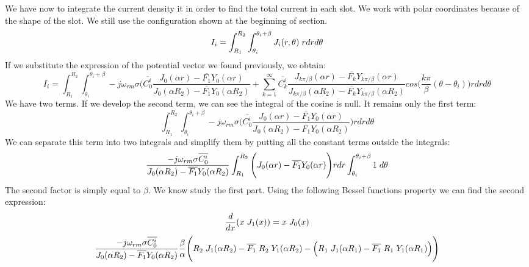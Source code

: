 We have now to integrate the current density it in order to find the total current in each slot. We work with polar coordinates because of the shape of the slot. We still use the configuration shown at the beginning of section. 
\begin{equation}
I_i = \int_{R_1}^{R_2} \int_{\theta_i}^{\theta_i+\beta} J_i(r,\theta) \hspace{1mm} r dr d\theta
\end{equation}
If we substitute the expression of the potential vector we found previously, we obtain: 
$$
{\scriptstyle
I_i = \int_{R_1}^{R_2} \int_{\theta_i}^{\theta_i+\beta} -j \omega_{rm} \sigma \Bigg( \overline{C_0^i} \frac{J_0(\alpha r) - \overline{F_1} Y_0(\alpha r)}{J_0( \alpha R_2) - \overline{F_1} Y_0(\alpha R_2)} + \sum_{k=1}^{\infty} \overline{C_k^i} \frac{J_{k \pi / \beta}(\alpha r) - \overline{F_k} Y_{k \pi / \beta}(\alpha r)}{J_{k \pi / \beta}( \alpha R_2) - \overline{F_k} Y_{k \pi / \beta}(\alpha R_2)}  cos(\frac{k \pi}{\beta} (\theta - \theta_i) \Bigg) r dr d\theta}
$$
We have two terms. If we develop the second term, we can see the integral of the cosine is null. It remains only the first term:
\begin{equation*}
\int_{R_1}^{R_2} \int_{\theta_i}^{\theta_i+\beta} -j \omega_{rm} \sigma \Bigg( \overline{C_0^i} \frac{J_0(\alpha r) - \overline{F_1} Y_0(\alpha r)}{J_0( \alpha R_2) - \overline{F_1} Y_0(\alpha R_2)}  \Bigg) r dr d\theta
\end{equation*}
We can separate this term into two integrals and simplify them by putting all the constant terms outside the integrals:
\begin{equation*}
\frac{-j \omega_{rm} \sigma \overline{C_0^i}}{J_0( \alpha R_2) - \overline{F_1} Y_0(\alpha R_2)} \int_{R_1}^{R_2}   \Bigg(  J_0(\alpha r) - \overline{F_1} Y_0(\alpha r)  \Bigg) r dr \int_{\theta_i}^{\theta_i+\beta} 1 \hspace{1mm}d\theta
\end{equation*}
The second factor is simply equal to $\beta$. We know study the first part. Using the following Bessel functions property we can find the second expression:
\begin{equation*}
    \frac{d}{dx} (x \hspace{1mm} J_1(x))  = x \hspace{1mm} J_0(x)
\end{equation*}
\begin{equation*}
\frac{-j \omega_{rm} \sigma \overline{C_0^i}}{J_0( \alpha R_2) - \overline{F_1} Y_0(\alpha R_2)} \frac{\beta}{\alpha}   \Bigg(  R_2 \hspace{1mm} J_1(\alpha R_2) - \overline{F_1}\hspace{1mm}R_2 \hspace{1mm}Y_1(\alpha R_2) - \Big( R_1 \hspace{1mm} J_1(\alpha R_1) - \overline{F_1}\hspace{1mm}R_1 \hspace{1mm}Y_1(\alpha R_1) \Big) \Bigg)  
\end{equation*}
